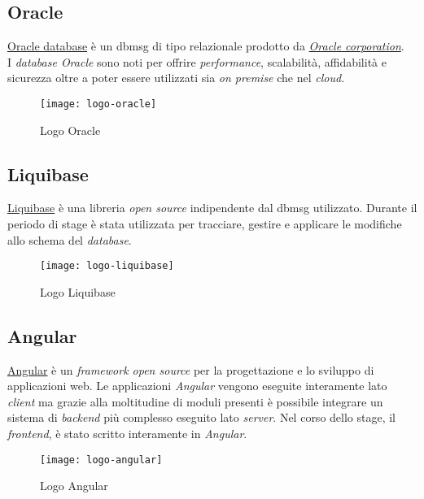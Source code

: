\subsection{Oracle}
\label{oracle}
\href{https://www.oracle.com/it/database/}{Oracle database} è un \gls{dbmsg} di tipo relazionale prodotto da \textit{\href{https://www.oracle.com/}{Oracle corporation}}. 
\\I \textit{database Oracle} sono noti per offrire \textit{performance}, scalabilità, affidabilità e sicurezza oltre a poter essere utilizzati sia \textit{on premise} che nel \textit{cloud}.
\begin{figure}[h]
    \begin{center}
    \texttt{[image: logo-oracle]}
    \caption{Logo Oracle}
    \label{fig:figure7}
    \end{center}
\end{figure}

\subsection{Liquibase}
\href{https://www.liquibase.org/}{Liquibase} è una libreria \textit{open source} indipendente dal \gls{dbmsg} utilizzato. Durante il periodo di stage è stata utilizzata per tracciare, gestire e applicare le modifiche allo schema del \textit{database}.
\begin{figure}[h]
    \begin{center}
    \texttt{[image: logo-liquibase]}
    \caption{Logo Liquibase}
    \label{fig:figure8}
    \end{center}
\end{figure}
\subsection{Angular}
\href{https://angular.io/}{Angular} è un \textit{framework open source} per la progettazione e lo sviluppo di applicazioni web.
Le applicazioni \textit{Angular} vengono eseguite interamente lato \textit{client} ma grazie alla moltitudine di moduli presenti è possibile integrare un sistema di \textit{backend} più complesso eseguito lato \textit{server}.
Nel corso dello stage, il \textit{frontend}, è stato scritto interamente in \textit{Angular}.
\begin{figure}[h]
    \begin{center}
    \texttt{[image: logo-angular]}
    \caption{Logo Angular}
    \label{fig:figure9}
    \end{center}
\end{figure}

